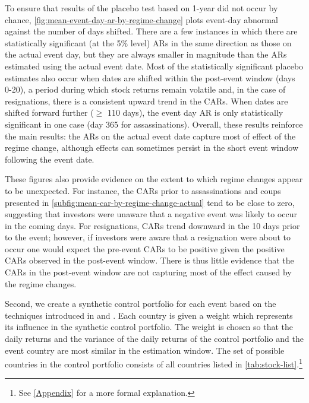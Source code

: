 \documentclass[12pt,final,fleqn]{article}
\theoremstyle{plain}
\begin{document}
To ensure that results of the placebo test based on 1-year did not occur by chance, \autoref{fig:mean-event-day-ar-by-regime-change} plots event-day abnormal against the number of days shifted. There are a few instances in which there are statistically significant (at the 5\% level) ARs in the same direction as those on the actual event day, but they are always smaller in magnitude than the ARs estimated using the actual event date. Most of the statistically significant placebo estimates also occur when dates are shifted within the post-event window (days 0-20), a period during which stock returns remain volatile and, in the case of resignations, there is a consistent upward trend in the CARs. When dates are shifted forward further ($\geq$ 110 days), the event day AR is only statistically significant in one case (day 365 for assassinations). Overall, these results reinforce the main results: the ARs on the actual event date capture most of effect of the regime change, although effects can sometimes persist in the short event window following the event date. 

These figures also provide evidence on the extent to which regime changes appear to be unexpected. For instance, the CARs prior to assassinations and coups presented in \autoref{subfig:mean-car-by-regime-change-actual} tend to be close to zero, suggesting that investors were unaware that a negative event was likely to occur in the coming days. For resignations, CARs trend downward in the 10 days prior to the event; however, if investors were aware that a resignation were about to occur one would expect the pre-event CARs to be positive given the positive CARs observed in the post-event window. There is thus little evidence that the CARs in the post-event window are not capturing most of the effect caused by the regime changes.

Second, we create a synthetic control portfolio for each event based on the techniques introduced in \citet{abadie2003economic} and \citet{abadie2010synthetic}. Each country is given a weight which represents its influence in the synthetic control portfolio. The weight is chosen so that the daily returns and the variance of the daily returns of the control portfolio and the event country are most similar in the estimation window. The set of possible countries in the control portfolio consists of all countries listed in \autoref{tab:stock-list}.\footnote{See \autoref{Appendix} for a more formal explanation.}
\end{document}
